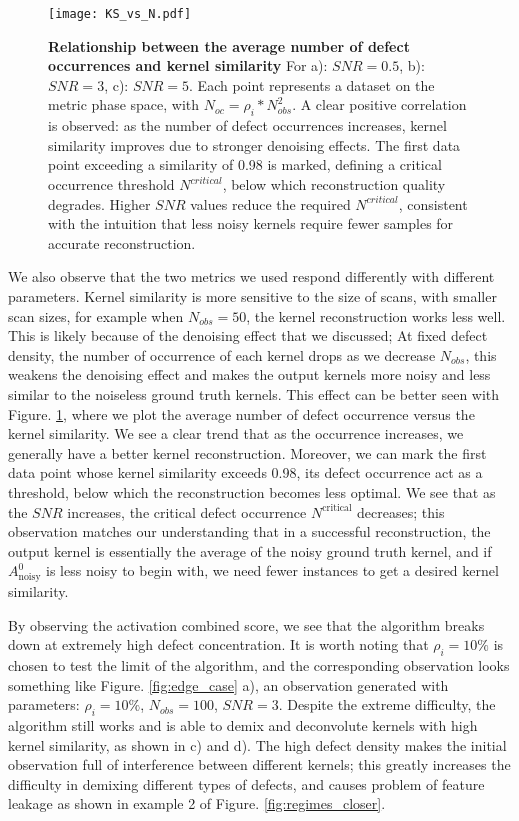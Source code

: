 \begin{figure}
	\texttt{[image: KS\_vs\_N.pdf]} 
	\centering
	\caption[\textbf{Relationship between the average number of defect occurrences and kernel similarity}]{\textbf{Relationship between the average number of defect occurrences and kernel similarity} For a): $SNR=0.5$, b): $SNR=3$, c): $SNR=5$. Each point represents a dataset on the metric phase space, with $N_{oc} = \rho_i * N_{obs}^2$. A clear positive correlation is observed: as the number of defect occurrences increases, kernel similarity improves due to stronger denoising effects. The first data point exceeding a similarity of 0.98 is marked, defining a critical occurrence threshold $N^{critical}$, below which reconstruction quality degrades. Higher $SNR$ values reduce the required $N^{critical}$, consistent with the intuition that less noisy kernels require fewer samples for accurate reconstruction.}
	\label{fig:KS_vs_N}
\end{figure}

We also observe that the two metrics we used respond differently with different parameters. Kernel similarity is more sensitive to the size of scans, with smaller scan sizes, for example when $N_{obs} = 50$, the kernel reconstruction works less well. This is likely because of the denoising effect that we discussed; At fixed defect density, the number of occurrence of each kernel drops as we decrease $N_{obs}$, this weakens the denoising effect and makes the output kernels more noisy and less similar to the noiseless ground truth kernels. This effect can be better seen with Figure. \ref{fig:KS_vs_N}, where we plot the average number of defect occurrence versus the kernel similarity. We see a clear trend that as the occurrence increases, we generally have a better kernel reconstruction. Moreover, we can mark the first data point whose kernel similarity exceeds 0.98, its defect occurrence act as a threshold, below which the reconstruction becomes less optimal. We see that as the $SNR$ increases, the critical defect occurrence $N^{\text{critical}}$ decreases; this observation matches our understanding that in a successful reconstruction, the output kernel is essentially the average of the noisy ground truth kernel, and if $A^0_{\text{noisy}}$ is less noisy to begin with, we need fewer instances to get a desired kernel similarity.   

By observing the activation combined score, we see that the algorithm breaks down at extremely high defect concentration. It is worth noting that $\rho_i = 10\%$ is chosen to test the limit of the algorithm, and the corresponding observation looks something like Figure. \ref{fig:edge_case} a), an observation generated with parameters: $\rho_i = 10\%$, $N_{obs}=100$, $SNR=3$. Despite the extreme difficulty, the algorithm still works and is able to demix and deconvolute kernels with high kernel similarity, as shown in c) and d). The high defect density makes the initial observation full of interference between different kernels; this greatly increases the difficulty in demixing different types of defects, and causes problem of feature leakage as shown in example 2 of Figure. \ref{fig:regimes_closer}.  


